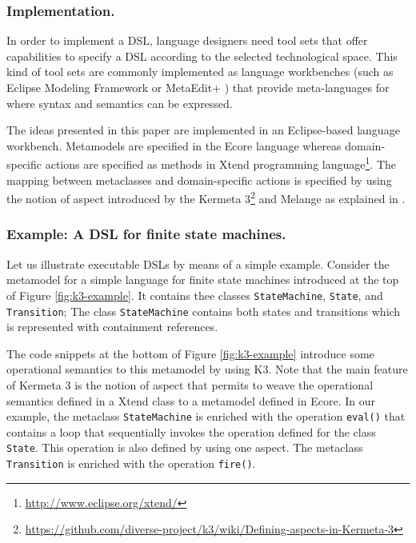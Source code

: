 \subsubsection{Implementation.} In order to implement a DSL, language designers need tool sets that offer capabilities to specify a DSL according to the selected technological space. This kind of tool sets are commonly implemented as language workbenches (such as Eclipse Modeling Framework \cite{Steinberg:2009} or MetaEdit+ \cite{Kelly:2013}) that provide meta-languages for where syntax and semantics can be expressed.

The ideas presented in this paper are implemented in an Eclipse-based language workbench. Metamodels are specified in the Ecore language whereas domain-specific actions are specified as methods in Xtend programming language\footnote{\url{http://www.eclipse.org/xtend/}}. The mapping between metaclasses and domain-specific actions is specified by using the notion of aspect introduced by the Kermeta 3\footnote{\url{https://github.com/diverse-project/k3/wiki/Defining-aspects-in-Kermeta-3}} and Melange as explained in \cite{degueule:2015}. 

\vspace{-3mm}
\subsubsection{Example: A DSL for finite state machines.} Let us illustrate executable DSLs by means of a simple example. Consider the metamodel for a simple language for finite state machines introduced at the top of Figure \ref{fig:k3-example}. It contains thee classes \texttt{StateMachine}, \texttt{State}, and \texttt{Transition}; The class \texttt{StateMachine} contains both states and transitions which is represented with containment references.

The code snippets at the bottom of Figure \ref{fig:k3-example} introduce some operational semantics to this metamodel by using K3. Note that the main feature of Kermeta 3 is the notion of aspect that permits to weave the operational semantics defined in a Xtend class to a metamodel defined in Ecore. In our example, the metaclass \texttt{StateMachine} is enriched with the operation \texttt{eval()} that contains a loop that sequentially invokes the operation defined for the class \texttt{State}. This operation is also defined by using one aspect. The metaclass \texttt{Transition} is enriched with the operation \texttt{fire()}.


